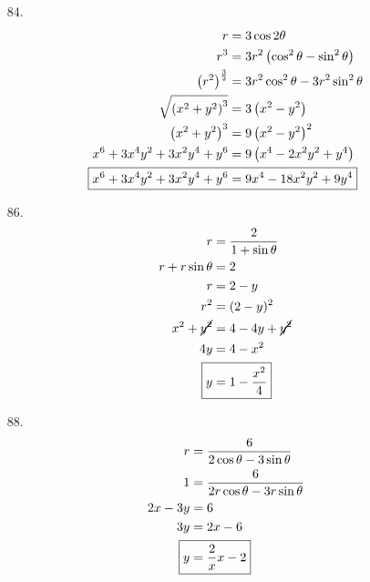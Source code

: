 \documentclass{article}
\begin{document}
\begin{multicols}{2}
\begin{itemize}
	\item[84.]
		\begin{align*}
			r&=3\cos2\theta \\
			r^3&=3r^2\left(\cos^2\theta-\sin^2\theta\right) \\
			\left(r^2\right)^{\frac{3}{2}}&=3r^2\cos^2\theta-3r^2\sin^2\theta \\
			\sqrt{\left(x^2+y^2\right)^3}&=3\left(x^2-y^2\right) \\
			\left(x^2+y^2\right)^3&=9\left(x^2-y^2\right)^2 \\
			x^6+3x^4y^2+3x^2y^4+y^6&=9\left(x^4-2x^2y^2+y^4\right) \\
			\Aboxed{x^6+3x^4y^2+3x^2y^4+y^6&=9x^4-18x^2y^2+9y^4}
		\end{align*}

	\item[86.]
		\begin{align*}
			r&=\frac{2}{1+\sin\theta} \\
			r+r\sin\theta&=2 \\
			r&=2-y \\
			r^2&=(2-y)^2 \\
			x^2+\cancel{y^2}&=4-4y+\cancel{y^2} \\
			4y&=4-x^2 \\
			\Aboxed{y&=1-\frac{x^2}{4}}
		\end{align*}

	\item[88.]
		\begin{align*}
			r&=\frac{6}{2\cos\theta-3\sin\theta} \\
			1&=\frac{6}{2r\cos\theta-3r\sin\theta} \\
			2x-3y&=6 \\
			3y&=2x-6 \\
			\Aboxed{y&=\frac{2}{x}x-2}
		\end{align*}
	\end{itemize}
\end{multicols}
\end{document}
